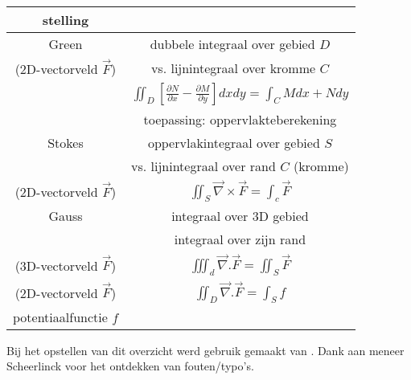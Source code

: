 \documentclass[10pt,a4paper]{article}
\begin{document}
\begin{center}
	\centering
	{\tabulinesep=1.5mm
		\begin{tabu}{|c|c|} 
			\hline
stelling & \\ \hline \hline

Green & dubbele integraal over gebied $D$ \\
(2D-vectorveld $\vec{F}$)	& vs. lijnintegraal over kromme $C$ \\ 
 	& $\iint_D \left[ \frac{\partial N}{\partial x } - \frac{\partial M}{\partial y} \right] dx dy = \int_C Mdx + Ndy $ \\ 
	& toepassing: oppervlakteberekening \\ \hline

Stokes & oppervlakintegraal over gebied $S$ \\
	& vs. lijnintegraal over rand $C$ (kromme) \\ 
(2D-vectorveld $\vec{F}$) & $\iint_S \vec{\nabla} \times \vec{F} = \int_c \vec{F}$ \\ \hline

Gauss & integraal over 3D gebied \\
	& integraal over zijn rand \\
(3D-vectorveld $\vec{F}$) & $\iiint_d \vec{\nabla}. \vec{F} = \iint_S \vec{F}$ \\ 

(2D-vectorveld $\vec{F}$) & $\iint_D \vec{\nabla} . \vec{F} =  \int_S f$ \\ 
potentiaalfunctie $f$ & \\ \hline
	
	\end{tabu}}
\end{center}


Bij het opstellen van dit overzicht werd gebruik gemaakt van \cite{VandewalleStefan2017AIS}. Dank aan meneer Scheerlinck voor het ontdekken van fouten/typo's.




\end{document}
